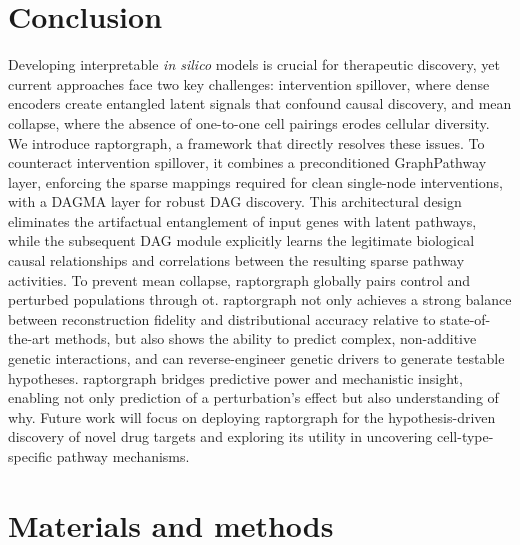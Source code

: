 \documentclass[10pt,letterpaper]{article}
\theoremstyle{definition}
\theoremstyle{remark}
\begin{document}
\section*{Conclusion}
Developing interpretable \emph{in silico} models is crucial for therapeutic discovery, yet current approaches face two key challenges: intervention spillover, where dense encoders create entangled latent signals that confound causal discovery, and mean collapse, where the absence of one-to-one cell pairings erodes cellular diversity. We introduce \gls{raptorgraph}, a framework that directly resolves these issues. To counteract intervention spillover, it combines a preconditioned GraphPathway layer, enforcing the sparse mappings required for clean single-node interventions, with a DAGMA layer for robust DAG discovery.
This architectural design eliminates the artifactual entanglement of input genes with latent pathways, while the subsequent DAG module explicitly learns the legitimate biological causal relationships and correlations between the resulting sparse pathway activities.
To prevent mean collapse, \gls{raptorgraph} globally pairs control and perturbed populations through \gls{ot}.
\gls{raptorgraph} not only achieves a strong balance between reconstruction fidelity and distributional accuracy relative to state-of-the-art methods, but also shows the ability to predict complex, non-additive genetic interactions, and can reverse-engineer genetic drivers to generate testable hypotheses.
\gls{raptorgraph} bridges predictive power and mechanistic insight, enabling not only prediction of a perturbation's effect but also understanding of why.
Future work will focus on deploying \gls{raptorgraph} for the hypothesis-driven discovery of novel drug targets and exploring its utility in uncovering cell-type-specific pathway mechanisms.




\section*{Materials and methods}
\end{document}
